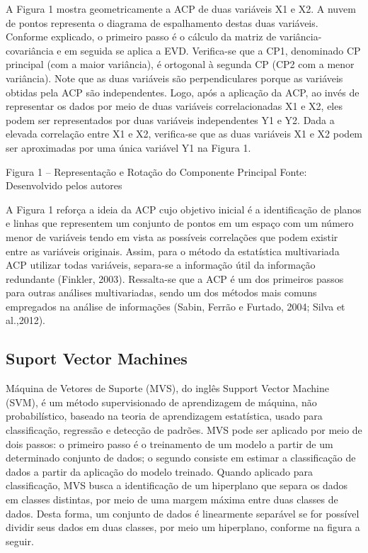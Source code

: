 A Figura 1 mostra geometricamente a ACP de duas variáveis X1 e X2. A nuvem de pontos representa o diagrama de espalhamento destas duas variáveis. Conforme explicado, o primeiro passo é o cálculo da matriz de variância-covariância e em seguida se aplica a EVD. Verifica-se que a CP1, denominado CP principal (com a maior variância), é ortogonal à segunda CP (CP2 com a menor variância). Note que as duas variáveis são perpendiculares porque as variáveis obtidas pela ACP são independentes. Logo, após a aplicação da ACP, ao invés de representar os dados por meio de duas variáveis correlacionadas X1 e X2, eles podem ser representados por duas variáveis independentes Y1 e Y2. Dada a elevada correlação entre X1 e X2, verifica-se que as duas variáveis X1 e X2 podem ser aproximadas por uma única variável Y1 na Figura 1.

Figura 1 – Representação e Rotação do Componente Principal
Fonte: Desenvolvido pelos autores

A Figura 1 reforça a ideia da ACP cujo objetivo inicial é a identificação de planos e linhas que representem um conjunto de pontos em um espaço com um número menor de variáveis tendo em vista as possíveis correlações que podem existir entre as variáveis originais.
Assim, para o método da estatística multivariada ACP utilizar todas variáveis, separa-se a informação útil da informação redundante (Finkler, 2003). Ressalta-se que a ACP é um dos primeiros passos para outras análises multivariadas, sendo um dos métodos mais comuns empregados na análise de informações (Sabin, Ferrão e Furtado, 2004; Silva et al.,2012).

\subsection{Suport Vector Machines}

Máquina de Vetores de Suporte (MVS), do inglês Support Vector Machine (SVM), é um método supervisionado de aprendizagem de máquina, não probabilístico, baseado na teoria de aprendizagem estatística, usado para classificação, regressão e detecção de padrões. MVS pode ser aplicado por meio de dois passos: o primeiro passo é o treinamento de um modelo a partir de um determinado conjunto de dados; o segundo consiste em estimar a classificação de dados a partir da aplicação do modelo treinado. 
Quando aplicado para classificação, MVS busca a identificação de um hiperplano que separa os dados em classes distintas, por meio de uma margem máxima entre duas classes de dados. Desta forma, um conjunto de dados é linearmente separável se for possível dividir seus dados em duas classes, por meio um hiperplano, conforme na figura a seguir. 

